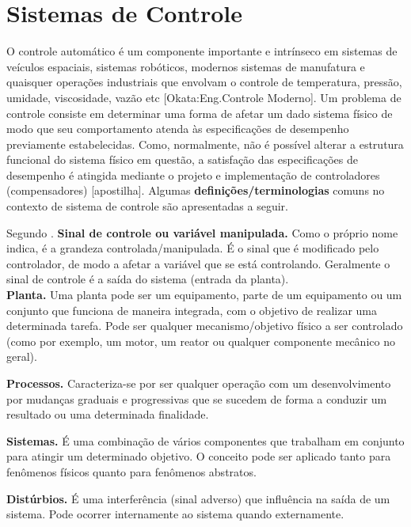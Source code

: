 \section{Sistemas de Controle}

O controle automático é um componente importante e intrínseco em sistemas de veículos espaciais, sistemas robóticos, modernos sistemas de manufatura e quaisquer operações industriais que envolvam o controle de temperatura, pressão, umidade, viscosidade, vazão etc \cite{ogata2011engenharia} [Okata:Eng.Controle Moderno]. Um problema de controle consiste em determinar uma forma de afetar um dado sistema físico de modo que seu comportamento atenda às especificações de desempenho previamente estabelecidas. Como, normalmente, não é possível alterar a estrutura funcional do sistema físico em questão, a satisfação das especificações de desempenho é atingida mediante o projeto e implementação de controladores (compensadores) [apostilha]. Algumas \textbf{definições/terminologias} comuns no contexto de sistema de controle são apresentadas a seguir.

Segundo \cite{ogata2011engenharia}.
\textbf{Sinal de controle ou variável manipulada.} Como o próprio nome indica, é a grandeza controlada/manipulada. É o sinal que é modificado pelo controlador, de modo a afetar a variável que se está controlando. Geralmente o sinal de controle é a saída do sistema (entrada da planta).\\

\textbf{Planta.} Uma planta pode ser um equipamento, parte de um equipamento ou um conjunto que funciona de maneira integrada, com o objetivo de realizar uma determinada tarefa. Pode ser qualquer mecanismo/objetivo físico a ser controlado (como por exemplo, um motor, um reator ou qualquer componente mecânico no geral).

\textbf{Processos.} Caracteriza-se por ser qualquer operação com um desenvolvimento por mudanças graduais e progressivas que se sucedem de forma a conduzir um resultado ou uma determinada finalidade.

\textbf{Sistemas.} É uma combinação de vários componentes que trabalham em conjunto para atingir um determinado objetivo. O conceito pode ser aplicado tanto para fenômenos físicos quanto para fenômenos abstratos.

\textbf{Distúrbios.} É uma interferência (sinal adverso) que influência na saída de um sistema. Pode ocorrer internamente ao sistema quando externamente.


